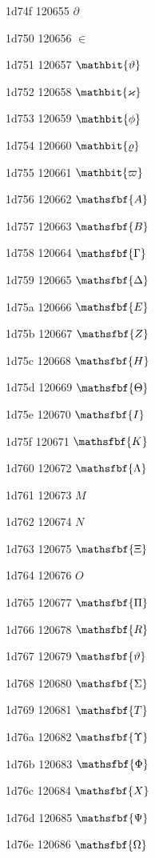 \documentclass[11pt]{article}
\begin{document}
1d74f 120655 \ensuremath{\partial}

1d750 120656 \ensuremath{\in}

1d751 120657 \ensuremath{\mathbit{\vartheta}}

1d752 120658 \ensuremath{\mathbit{\varkappa}}

1d753 120659 \ensuremath{\mathbit{\phi}}

1d754 120660 \ensuremath{\mathbit{\varrho}}

1d755 120661 \ensuremath{\mathbit{\varpi}}

1d756 120662 \ensuremath{\mathsfbf{{A}}}

1d757 120663 \ensuremath{\mathsfbf{{B}}}

1d758 120664 \ensuremath{\mathsfbf{\Gamma}}

1d759 120665 \ensuremath{\mathsfbf{\Delta}}

1d75a 120666 \ensuremath{\mathsfbf{{E}}}

1d75b 120667 \ensuremath{\mathsfbf{{Z}}}

1d75c 120668 \ensuremath{\mathsfbf{{H}}}

1d75d 120669 \ensuremath{\mathsfbf{\Theta}}

1d75e 120670 \ensuremath{\mathsfbf{{I}}}

1d75f 120671 \ensuremath{\mathsfbf{{K}}}

1d760 120672 \ensuremath{\mathsfbf{\Lambda}}

1d761 120673 \ensuremath{M}

1d762 120674 \ensuremath{N}

1d763 120675 \ensuremath{\mathsfbf{\Xi}}

1d764 120676 \ensuremath{O}

1d765 120677 \ensuremath{\mathsfbf{\Pi}}

1d766 120678 \ensuremath{\mathsfbf{{R}}}

1d767 120679 \ensuremath{\mathsfbf{\vartheta}}

1d768 120680 \ensuremath{\mathsfbf{\Sigma}}

1d769 120681 \ensuremath{\mathsfbf{{T}}}

1d76a 120682 \ensuremath{\mathsfbf{\Upsilon}}

1d76b 120683 \ensuremath{\mathsfbf{\Phi}}

1d76c 120684 \ensuremath{\mathsfbf{{X}}}

1d76d 120685 \ensuremath{\mathsfbf{\Psi}}

1d76e 120686 \ensuremath{\mathsfbf{\Omega}}
\end{document}
